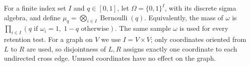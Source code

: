 \begin{definition}
For a finite index set $I$ and $q\in[0,1]$, let
$\Omega=\{0,1\}^{I}$, with its discrete sigma algebra, and define
$\mu_q=\bigotimes_{i\in I}\operatorname{Bernoulli}(q)$.
Equivalently, the mass of $\omega$ is
$\prod_{i\in I}(q\text{ if }\omega_i=1,\;1-q\text{ otherwise})$.
The same sample $\omega$ is used for every retention test. For a graph on
$V$ we use $I=V\times V$; only coordinates oriented from $L$ to $R$
are used, so disjointness of $L,R$ assigns exactly one coordinate to
each undirected cross edge. Unused coordinates have no effect on the graph.
\end{definition}
